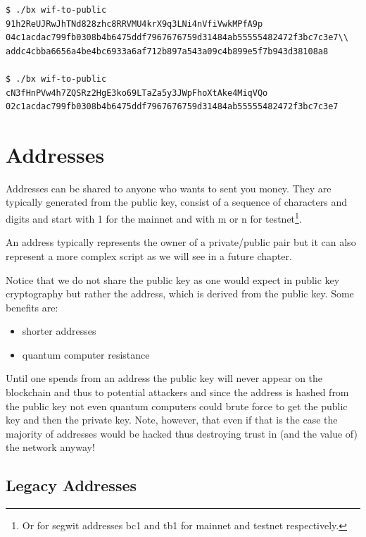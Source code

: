 \begin{emphbox}
\begin{lstlisting}[style=Bash]
$ ./bx wif-to-public 91h2ReUJRwJhTNd828zhc8RRVMU4krX9q3LNi4nVfiVwkMPfA9p
04c1acdac799fb0308b4b6475ddf7967676759d31484ab55555482472f3bc7c3e7\\
addc4cbba6656a4be4bc6933a6af712b897a543a09c4b899e5f7b943d38108a8

$ ./bx wif-to-public cN3fHnPVw4h7ZQSRz2HgE3ko69LTaZa5y3JWpFhoXtAke4MiqVQo
02c1acdac799fb0308b4b6475ddf7967676759d31484ab55555482472f3bc7c3e7
\end{lstlisting}
\end{emphbox}


\section{Addresses}
\label{sec:addresses}
Addresses can be shared to anyone who wants to sent you money. They are typically generated from the public key, consist of a sequence of characters and digits and start with 1 for the mainnet and with m or n for testnet\footnote{Or for segwit addresses bc1 and tb1 for mainnet and testnet respectively.}.

An address typically represents the owner of a private/public pair but it can also represent a more complex script as we will see in a future chapter.

Notice that we do not share the public key as one would expect in public key cryptography but rather the address, which is derived from the public key. Some benefits are:

\begin{itemize}
\item shorter addresses
\item quantum computer resistance
\end{itemize}

\begin{note}
Until one spends from an address the public key will never appear on the blockchain and thus to potential attackers and since the address is hashed from the public key not even quantum computers could brute force to get the public key and then the private key. Note, however, that even if that is the case the majority of addresses would be hacked thus destroying trust in (and the value of) the network anyway!
\end{note}

\subsection*{Legacy Addresses}
\label{ssec:legacy-addresses}

